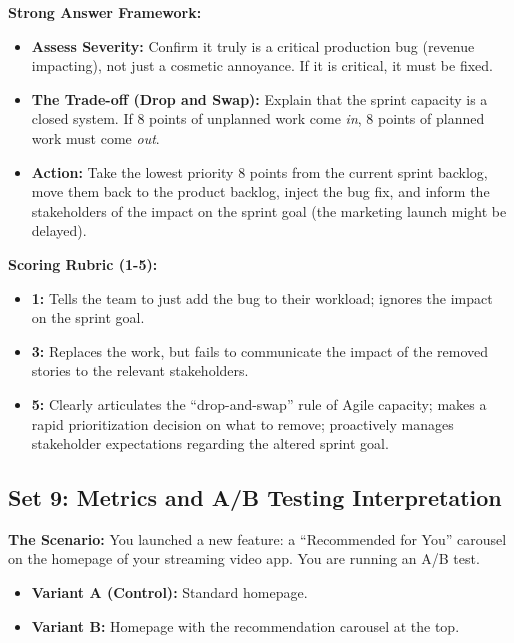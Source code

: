 \textbf{Strong Answer Framework:}

\begin{itemize}
\tightlist
\item
  \textbf{Assess Severity:} Confirm it truly is a critical production
  bug (revenue impacting), not just a cosmetic annoyance. If it is
  critical, it must be fixed.
\item
  \textbf{The Trade-off (Drop and Swap):} Explain that the sprint
  capacity is a closed system. If 8 points of unplanned work come
  \emph{in}, 8 points of planned work must come \emph{out}.
\item
  \textbf{Action:} Take the lowest priority 8 points from the current
  sprint backlog, move them back to the product backlog, inject the bug
  fix, and inform the stakeholders of the impact on the sprint goal (the
  marketing launch might be delayed).
\end{itemize}

\textbf{Scoring Rubric (1-5):}

\begin{itemize}
\tightlist
\item
  \textbf{1:} Tells the team to just add the bug to their workload;
  ignores the impact on the sprint goal.
\item
  \textbf{3:} Replaces the work, but fails to communicate the impact of
  the removed stories to the relevant stakeholders.
\item
  \textbf{5:} Clearly articulates the ``drop-and-swap'' rule of Agile
  capacity; makes a rapid prioritization decision on what to remove;
  proactively manages stakeholder expectations regarding the altered
  sprint goal.
\end{itemize}

\bigskip

\subsection{Set 9: Metrics and A/B Testing
Interpretation}\label{set-9-metrics-and-ab-testing-interpretation}

\textbf{The Scenario:} You launched a new feature: a ``Recommended for
You'' carousel on the homepage of your streaming video app. You are
running an A/B test.

\begin{itemize}
\tightlist
\item
  \textbf{Variant A (Control):} Standard homepage.
\item
  \textbf{Variant B:} Homepage with the recommendation carousel at the
  top.
\end{itemize}

